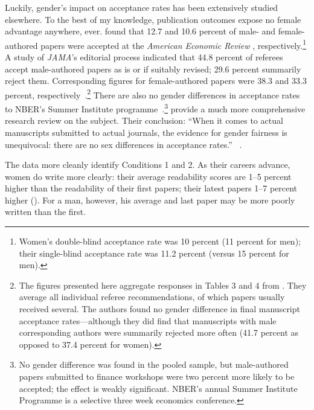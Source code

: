 \begin{appendices}
Luckily, gender's impact on acceptance rates has been extensively studied elsewhere. To the best of my knowledge, publication outcomes expose no female advantage anywhere, ever.  \citet{Blank1991} found that 12.7 and 10.6 percent of male- and female-authored papers were accepted at the \emph{American Economic Review} , respectively.\footnote{Women's double-blind acceptance rate was 10 percent (11 percent for men); their single-blind acceptance rate was 11.2 percent (versus 15 percent for men).} A study of \emph{JAMA}'s editorial process indicated that 44.8 percent of referees accept male-authored papers as is or if suitably revised; 29.6 percent summarily reject them. Corresponding figures for female-authored papers were 38.3 and 33.3 percent, respectively~\citep{Gilbert1994}.\footnote{The figures presented here aggregate responses in Tables 3 and 4 from  \citet[][p. 141]{Gilbert1994}. They average all individual referee recommendations, of which papers usually received several. The authors found no gender difference in final manuscript acceptance rates---although they did find that manuscripts with male corresponding authors were summarily rejected more often (41.7 percent as opposed to 37.4 percent for women).} There are also no gender differences in acceptance rates to NBER's Summer Institute programme~\citep{Chari2017}.\footnote{No gender difference was found in the pooled sample, but male-authored papers submitted to finance workshops were two percent more likely to be accepted; the effect is weakly significant. NBER's annual Summer Institute Programme is a selective three week economics conference.}  \citet{Ceci2014} provide a much more comprehensive research review on the subject. Their conclusion: ``When it comes to actual manuscripts submitted to actual journals, the evidence for gender fairness is unequivocal: there are no sex differences in acceptance rates.'' ~\citep[][p. 111]{Ceci2014}.

The data more cleanly identify Conditions 1 and 2. As their careers advance, women do write more clearly: their average readability scores are 1--5 percent higher than the readability of their first papers; their latest papers 1--7 percent higher (). For a man, however, his average and last paper may be more poorly written than the first.




\end{appendices}
